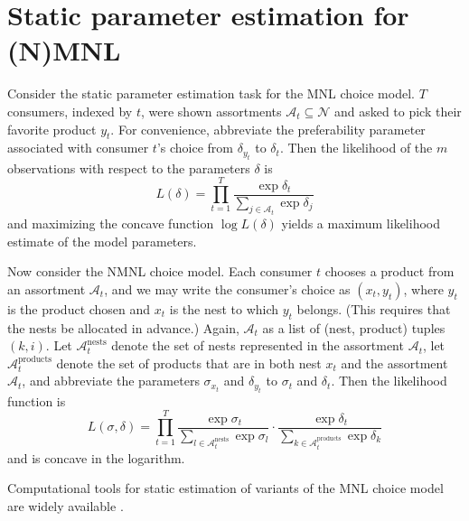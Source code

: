 \documentclass[preprint,12pt,authoryear]{elsarticle}
\begin{document}
\section{Static parameter estimation for (N)MNL}
Consider the static parameter estimation task for the MNL choice model. $T$ consumers, indexed by $t$, were shown assortments $\mathcal{A}_t \subseteq \mathcal{N}$ and asked to pick their favorite product $y_t$. For convenience, abbreviate the preferability parameter associated with consumer $t$'s choice from $\delta_{y_t}$ to $\delta_t$. Then the likelihood of the $m$ observations with respect to the parameters $\delta$ is
\begin{equation} \label{mnllikelihood}
L(\delta) = \prod_{t=1}^T \frac{\exp \delta_t}{\sum_{j\in \mathcal{A}_t} \exp \delta_j}
\end{equation}
and maximizing the concave function $\log L(\delta)$ yields a maximum likelihood estimate of the model parameters.

Now consider the NMNL choice model. Each consumer $t$ chooses a product from an assortment $\mathcal{A}_t$, and we may write the consumer's choice as $(x_t, y_t)$, where $y_t$ is the product chosen and $x_t$ is the nest to which $y_t$ belongs. (This requires that the nests be allocated in advance.) Again, $\mathcal{A}_t$ as a list of (nest, product) tuples $(k, i)$. Let $\mathcal{A}_t^{\text{nests}}$ denote the set of nests represented in the assortment $\mathcal{A}_t$, let $\mathcal{A}_{t}^{\text{products}}$ denote the set of products that are in both nest $x_t$ and the assortment $\mathcal{A}_t$, and abbreviate the parameters $\sigma_{x_t}$ and $\delta_{y_t}$ to $\sigma_t$ and $\delta_t$. Then the likelihood function is
\begin{equation}L(\sigma, \delta) = \prod_{t=1}^T \frac{\exp \sigma_t}{\sum_{l\in \mathcal{A}_t^{\text{nests}}} \exp \sigma_l} \cdot \frac{\exp \delta_t}{\sum_{k \in \mathcal{A}_{t}^{\text{products}}} \exp \delta_k}\end{equation}
and is concave in the logarithm.

Computational tools for static estimation of variants of the MNL choice model are widely available \cite[e.g.][]{croissantnd}.
\end{document}
